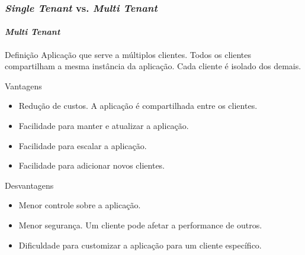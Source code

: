 \documentclass[
	9pt, %
	t, %
]{beamer}
\begin{document}
\begin{frame}
	\frametitle{\textit{Single Tenant} vs. \textit{Multi Tenant}}
	\framesubtitle{\textit{Multi Tenant}}

	\begin{block}{Definição}
		Aplicação que serve a múltiplos clientes. Todos os clientes compartilham a mesma instância da aplicação. Cada cliente é isolado dos demais.
	\end{block}

	\begin{exampleblock}{Vantagens}
		\begin{itemize}
			\item Redução de custos. A aplicação é compartilhada entre os clientes.
			\item Facilidade para manter e atualizar a aplicação.
			\item Facilidade para escalar a aplicação.
			\item Facilidade para adicionar novos clientes.
		\end{itemize}
	\end{exampleblock}

	\begin{alertblock}{Desvantagens}
		\begin{itemize}
			\item Menor controle sobre a aplicação.
			\item Menor segurança. Um cliente pode afetar a performance de outros.
			\item Dificuldade para customizar a aplicação para um cliente específico.
		\end{itemize}
	\end{alertblock}

\end{frame}
\end{document}

